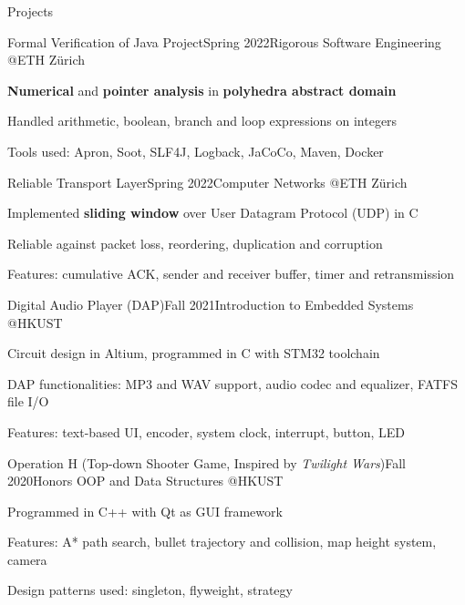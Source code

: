 \documentclass{resume}
\begin{document}
\begin{rSection}{Projects}
    \begin{rSubsection}{Formal Verification of Java Project}{Spring 2022}{Rigorous Software Engineering @ETH Zürich}{}
        \item \textbf{Numerical} and \textbf{pointer analysis} in \textbf{polyhedra abstract domain}
        \item Handled arithmetic, boolean, branch and loop expressions on integers
        \item Tools used: Apron, Soot, SLF4J, Logback, JaCoCo, Maven, Docker
    \end{rSubsection}

    \begin{rSubsection}{Reliable Transport Layer}{Spring 2022}{Computer Networks @ETH Zürich}{}
        \item Implemented \textbf{sliding window} over User Datagram Protocol (UDP) in C
        \item Reliable against packet loss, reordering, duplication and corruption
        \item Features: cumulative ACK, sender and receiver buffer, timer and retransmission
    \end{rSubsection}

    \begin{rSubsection}{Digital Audio Player (DAP)}{Fall 2021}{Introduction to Embedded Systems @HKUST}{}
        \item Circuit design in Altium, programmed in C with STM32 toolchain
        \item DAP functionalities: MP3 and WAV support, audio codec and equalizer, FATFS file I/O
        \item Features: text-based UI, encoder, system clock, interrupt, button, LED
    \end{rSubsection}

    \begin{rSubsection}{Operation H (Top-down Shooter Game, Inspired by \emph{Twilight Wars})}{Fall 2020}{Honors OOP and Data Structures @HKUST}{}
        \item Programmed in C++ with Qt as GUI framework
        \item Features: A* path search, bullet trajectory and collision, map height system, camera
        \item Design patterns used: singleton, flyweight, strategy
    \end{rSubsection}
\end{rSection}
\end{document}
